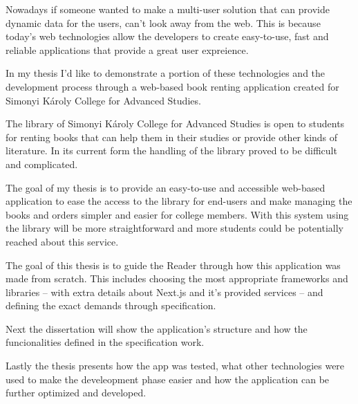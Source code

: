 Nowadays if someone wanted to make a multi-user solution that can provide dynamic data for the users, can't look away from the web.
This is because today's web technologies allow the developers to create easy-to-use, fast and reliable applications that provide a great user expreience.

In my thesis I'd like to demonstrate a portion of these technologies and the development process through a web-based book renting application
created for Simonyi Károly College for Advanced Studies.

The library of Simonyi Károly College for Advanced Studies is open to students for renting books that can help them in their
studies or provide other kinds of literature. In its current form the handling of the library proved to be difficult and complicated.

The goal of my thesis is to provide an easy-to-use and accessible web-based application to ease the access to the library for end-users
and make managing the books and orders simpler and easier for college members. With this system using the library will be more straightforward
and more students could be potentially reached about this service.

The goal of this thesis is to guide the Reader through how this application was made from scratch. This includes choosing the
most appropriate frameworks and libraries -- with extra details about Next.js and it's provided services -- and defining the
exact demands through specification.

Next the dissertation will show the application's structure and how the funcionalities defined in the specification work.

Lastly the thesis presents how the app was tested, what other technologies were used to make the develeopment phase easier and how
the application can be further optimized and developed.

\vfill
\selectthesislanguage

\setcounter{romanPage}{\value{page}}
